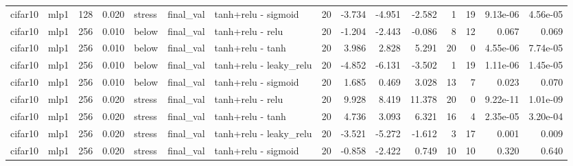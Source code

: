 \begin{table}[htbp]
{\begin{tabular}{@{}llrrlllrrrrrrrr@{}}
cifar10 & mlp1 & 128 & 0.020 & stress & final\_val & tanh+relu - sigmoid & 20 & -3.734 & -4.951 & -2.582 & 1 & 19 & 9.13e-06 & 4.56e-05 \\
cifar10 & mlp1 & 256 & 0.010 & below & final\_val & tanh+relu - relu & 20 & -1.204 & -2.443 & -0.086 & 8 & 12 & 0.067 & 0.069 \\
cifar10 & mlp1 & 256 & 0.010 & below & final\_val & tanh+relu - tanh & 20 & 3.986 & 2.828 & 5.291 & 20 & 0 & 4.55e-06 & 7.74e-05 \\
cifar10 & mlp1 & 256 & 0.010 & below & final\_val & tanh+relu - leaky\_relu & 20 & -4.852 & -6.131 & -3.502 & 1 & 19 & 1.11e-06 & 1.45e-05 \\
cifar10 & mlp1 & 256 & 0.010 & below & final\_val & tanh+relu - sigmoid & 20 & 1.685 & 0.469 & 3.028 & 13 & 7 & 0.023 & 0.070 \\
cifar10 & mlp1 & 256 & 0.020 & stress & final\_val & tanh+relu - relu & 20 & 9.928 & 8.419 & 11.378 & 20 & 0 & 9.22e-11 & 1.01e-09 \\
cifar10 & mlp1 & 256 & 0.020 & stress & final\_val & tanh+relu - tanh & 20 & 4.736 & 3.093 & 6.321 & 16 & 4 & 2.35e-05 & 3.20e-04 \\
cifar10 & mlp1 & 256 & 0.020 & stress & final\_val & tanh+relu - leaky\_relu & 20 & -3.521 & -5.272 & -1.612 & 3 & 17 & 0.001 & 0.009 \\
cifar10 & mlp1 & 256 & 0.020 & stress & final\_val & tanh+relu - sigmoid & 20 & -0.858 & -2.422 & 0.749 & 10 & 10 & 0.320 & 0.640 \\
\bottomrule
\end{tabular}}
\end{table}
